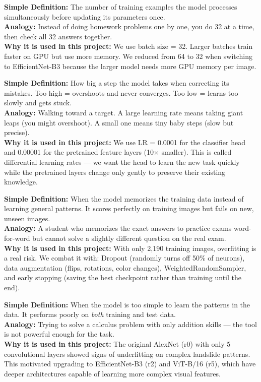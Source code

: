 \documentclass[11pt]{article}
\begin{document}
\begin{description}[style=nextline, leftmargin=1.5cm]
    \item[\textbf{Batch Size}]
    \textbf{Simple Definition:} The number of training examples the model processes simultaneously before updating its parameters once.\\
    \textbf{Analogy:} Instead of doing homework problems one by one, you do 32 at a time, then check all 32 answers together.\\
    \textbf{Why it is used in this project:} We use batch size = 32. Larger batches train faster on GPU but use more memory. We reduced from 64 to 32 when switching to EfficientNet-B3 because the larger model needs more GPU memory per image.

    \item[\textbf{Learning Rate}]
    \textbf{Simple Definition:} How big a step the model takes when correcting its mistakes. Too high = overshoots and never converges. Too low = learns too slowly and gets stuck.\\
    \textbf{Analogy:} Walking toward a target. A large learning rate means taking giant leaps (you might overshoot). A small one means tiny baby steps (slow but precise).\\
    \textbf{Why it is used in this project:} We use LR = 0.0001 for the classifier head and 0.00001 for the pretrained feature layers (10$\times$ smaller). This is called differential learning rates --- we want the head to learn the new task quickly while the pretrained layers change only gently to preserve their existing knowledge.

    \item[\textbf{Overfitting}]
    \textbf{Simple Definition:} When the model memorizes the training data instead of learning general patterns. It scores perfectly on training images but fails on new, unseen images.\\
    \textbf{Analogy:} A student who memorizes the exact answers to practice exams word-for-word but cannot solve a slightly different question on the real exam.\\
    \textbf{Why it is used in this project:} With only 2,190 training images, overfitting is a real risk. We combat it with: Dropout (randomly turns off 50\% of neurons), data augmentation (flips, rotations, color changes), WeightedRandomSampler, and early stopping (saving the best checkpoint rather than training until the end).

    \item[\textbf{Underfitting}]
    \textbf{Simple Definition:} When the model is too simple to learn the patterns in the data. It performs poorly on \emph{both} training and test data.\\
    \textbf{Analogy:} Trying to solve a calculus problem with only addition skills --- the tool is not powerful enough for the task.\\
    \textbf{Why it is used in this project:} The original AlexNet (r0) with only 5 convolutional layers showed signs of underfitting on complex landslide patterns. This motivated upgrading to EfficientNet-B3 (r2) and ViT-B/16 (r5), which have deeper architectures capable of learning more complex visual features.


\end{description}
\end{document}
